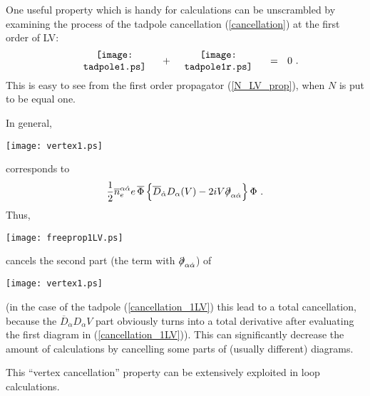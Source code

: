 \documentclass[12pt]{revtex4}
\newcommand{\slashed}[1]{\hbox{{$#1$}\llap{$/$}}}
\begin{document}
One useful property which is handy for calculations
can be unscrambled by examining the process of the
tadpole cancellation (\ref{cancellation}) at the first 
order of LV:
\begin{equation}
\label{cancellation_1LV}
\begin{minipage}[c]{3.0cm}
\centering
\texttt{[image: tadpole1.ps]} 
\end{minipage}
~+~
\begin{minipage}[c]{3.0cm}
\centering
\texttt{[image: tadpole1r.ps]} 
\end{minipage}
~~=~~
0
~.
\end{equation}
This is easy to see from the first order propagator
(\ref{N_LV_prop}), when $ N $ is put to be equal one.

In general, 
\begin{minipage}[b]{1.5cm}
\centering
\texttt{[image: vertex1.ps]} 
\vspace{-0.1cm}
\end{minipage}
corresponds to
\[
\frac{1}{2} \overline{n}_e^{\alpha\dot\alpha}
e\, \overline{\Phi}\,
\Bigl\{
\overline{D}_{\dot\alpha} D_\alpha ( V )
- 
2 i V \slashed{\partial}_{\alpha\dot\alpha}
\Bigr\}\,
 \Phi
~.
\] 
Thus, 
\begin{minipage}[b]{1.7cm}
\centering
\texttt{[image: freeprop1LV.ps]} 
\vspace{-0.06cm}
\end{minipage}
cancels the second part
(the term with $ \slashed{\partial}_{\alpha\dot\alpha}$)
of 
\begin{minipage}[b]{1.5cm}
\centering
\texttt{[image: vertex1.ps]} 
\vspace{-0.1cm}
\end{minipage}
(in the case of the tadpole (\ref{cancellation_1LV}) 
this lead to a total 
cancellation,
because the 
$ \overline{D}_{\dot\alpha} D_\alpha V $
part obviously turns into a total derivative after evaluating
the first diagram in (\ref{cancellation_1LV})).
This can significantly decrease the amount of calculations
by cancelling some parts of (usually different) diagrams.

This ``vertex cancellation'' property can be extensively
exploited in loop calculations.
\end{document}
